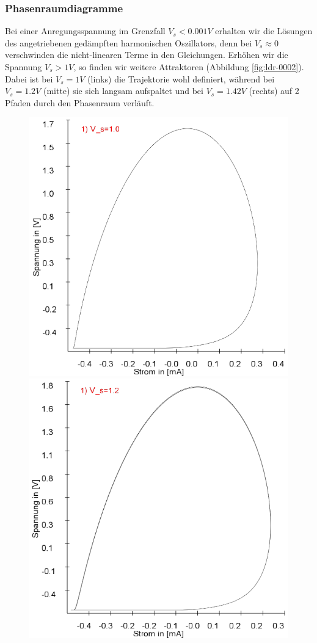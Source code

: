 \documentclass{scrartcl}
\begin{document}
\subsubsection{Phasenraumdiagramme}
Bei einer Anregungsspannung im Grenzfall $V_s < 0.001V$ erhalten wir die Lösungen des angetriebenen gedämpften harmonischen Oszillators, denn bei $V_s \approx 0$ verschwinden die nicht-linearen Terme in den Gleichungen. 
Erhöhen wir die Spannung $V_s>1V$, so finden wir weitere Attraktoren (Abbildung \ref{fig:ldr-0002}). Dabei ist bei $V_s=1V$ (links) die Trajektorie wohl definiert, während bei $V_s=1.2V$ (mitte) sie sich langsam aufspaltet und bei $V_s=1.42V$ (rechts) auf 2 Pfaden durch den Phasenraum verläuft.
\begin{figure}[!htbp]
\includegraphics[scale=0.28]{schwing-runge-nach300k-weitere20k-10-9-1V}
\includegraphics[scale=0.28]{schwing-runge-nach300k-weitere20k-10-9-1,2V}

\end{figure}
\end{document}
